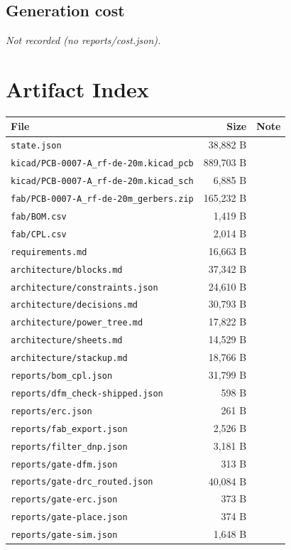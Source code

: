 \documentclass[11pt,a4paper]{article}
\begin{document}
\subsection*{Generation cost}
\emph{Not recorded (no reports/cost.json).}
\section{Artifact Index}
{\small
\begin{longtable}{p{9cm}rp{4cm}}
\toprule
\textbf{File} & \textbf{Size} & \textbf{Note} \\
\midrule
\endhead
\texttt{state.json} & 38,882 B &  \\
\texttt{kicad/PCB-0007-A\_rf-de-20m.kicad\_pcb} & 889,703 B &  \\
\texttt{kicad/PCB-0007-A\_rf-de-20m.kicad\_sch} & 6,885 B &  \\
\texttt{fab/PCB-0007-A\_rf-de-20m\_gerbers.zip} & 165,232 B &  \\
\texttt{fab/BOM.csv} & 1,419 B &  \\
\texttt{fab/CPL.csv} & 2,014 B &  \\
\texttt{requirements.md} & 16,663 B &  \\
\texttt{architecture/blocks.md} & 37,342 B &  \\
\texttt{architecture/constraints.json} & 24,610 B &  \\
\texttt{architecture/decisions.md} & 30,793 B &  \\
\texttt{architecture/power\_tree.md} & 17,822 B &  \\
\texttt{architecture/sheets.md} & 14,529 B &  \\
\texttt{architecture/stackup.md} & 18,766 B &  \\
\texttt{reports/bom\_cpl.json} & 31,799 B &  \\
\texttt{reports/dfm\_check-shipped.json} & 598 B &  \\
\texttt{reports/erc.json} & 261 B &  \\
\texttt{reports/fab\_export.json} & 2,526 B &  \\
\texttt{reports/filter\_dnp.json} & 3,181 B &  \\
\texttt{reports/gate-dfm.json} & 313 B &  \\
\texttt{reports/gate-drc\_routed.json} & 40,084 B &  \\
\texttt{reports/gate-erc.json} & 373 B &  \\
\texttt{reports/gate-place.json} & 374 B &  \\
\texttt{reports/gate-sim.json} & 1,648 B &  \\

\end{longtable}}
\end{document}
